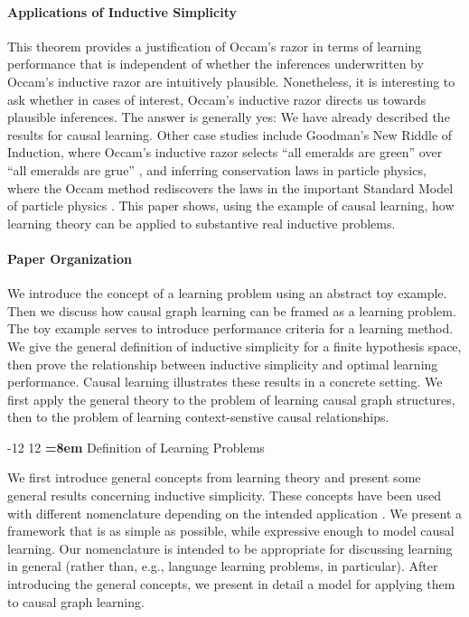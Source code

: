 \documentclass{elsarticle}%
\makeatletter
\renewcommand\section{\@startsection {section}{1}{\z@}%
  {-12\p@ \@plus -4\p@ \@minus -4\p@}%
                       {12\p@ \@plus 4\p@ \@minus 4\p@}%
                                   {\normalfont\large\bfseries\boldmath
                                   \rightskip=\z@ \@plus 8em\pretolerance=10000 }}
\makeatother
\begin{document}
\paragraph{Applications of Inductive Simplicity}
This theorem provides a justification of Occam's razor in terms of learning performance that is independent of whether the inferences underwritten by Occam's inductive razor are intuitively plausible. Nonetheless, it is interesting to ask whether in cases of interest, Occam's inductive razor directs us towards plausible inferences. The answer is generally yes: We have already described the results for causal learning. Other case studies include Goodman's New Riddle of Induction, where Occam's inductive razor selects ``all emeralds are green'' over ``all emeralds are grue'' \cite{bib:bjps}, and inferring conservation laws in particle physics, where the Occam method rediscovers the laws in the important Standard Model of particle physics \cite{Schulte08b}. This paper shows, using the example of causal learning, how learning theory can be applied to substantive real inductive problems.


\paragraph{Paper Organization} We introduce the concept of a learning problem using an abstract toy example. Then we discuss how causal graph learning can be framed as a learning problem. The toy example serves to introduce performance criteria for a learning method. We give the general definition of inductive simplicity for a finite hypothesis space, then prove the relationship between inductive simplicity and optimal learning performance. Causal learning illustrates these results in a concrete setting. We first apply the general theory to the problem of learning causal graph structures, then to the problem of learning context-senstive causal relationships. 

\section{Definition of Learning Problems}

We first introduce general concepts from learning theory and present some general results concerning inductive simplicity. These concepts have been used with different nomenclature depending on the intended application \cite{jain99:_system_that_learn,Kelly1996,martin98elements}. We present a framework that is as simple as possible, while expressive enough to model causal learning. Our nomenclature is intended to be appropriate for discussing learning in general (rather than, e.g., language learning problems, in particular). After introducing the general concepts, we present in detail a model for applying them to causal graph learning.
\end{document}
